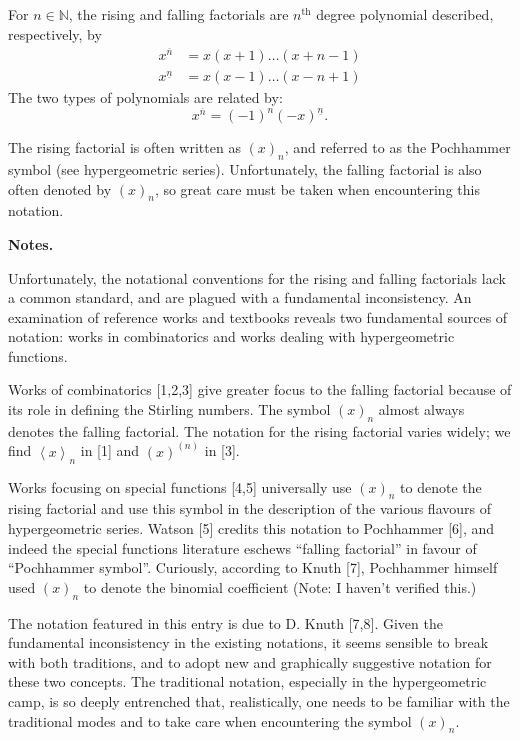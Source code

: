 \documentclass{article}
\newcommand{\natnums}{\mathbb{N}}
\newcommand{\supth}{^{\text{th}}}
\newcommand{\on}{{\overline{n}}}
\newcommand{\un}{{\underline{n}}}
\begin{document}
For $n\in\natnums$, the rising and falling factorials are $n\supth$
degree polynomial described, respectively, by
\begin{align*}
x^\on &= x(x+1)\ldots (x+n-1) \\
x^\un &= x(x-1)\ldots (x-n+1)
\end{align*}
The two types of polynomials are related by:
$$x^\on = (-1)^n (-x)^\un.$$


The rising factorial is often written as $(x)_n$, and referred to as
the Pochhammer symbol (see hypergeometric series). Unfortunately, the
falling factorial is also often denoted by $(x)_n$, so great care must
be taken when encountering this notation.


{\bf Notes.}  

Unfortunately, the notational conventions for the rising and falling
factorials lack a common standard, and are plagued with a fundamental
inconsistency. An examination of reference works and textbooks reveals
two fundamental sources of notation: works in combinatorics and works
dealing with hypergeometric functions.

Works of combinatorics [1,2,3] give greater focus to the falling
factorial because of its role in defining the Stirling numbers.
The symbol $(x)_n$ almost always denotes the falling factorial.  The
notation for the rising factorial varies widely; we find
$\left<x\right>_n$ in [1] and $(x)^{(n)}$ in [3].

Works focusing on special functions [4,5]  universally use $(x)_n$ to
denote the rising factorial and use this symbol in the description of
the various flavours of hypergeometric series.  Watson [5] credits
this notation to Pochhammer [6], and indeed the special functions
literature eschews ``falling factorial'' in favour of ``Pochhammer
symbol''.  Curiously, according to Knuth [7], Pochhammer himself used
$(x)_n$ to denote the binomial coefficient (Note: I haven't verified
this.)
 
The notation featured in this entry is due to D. Knuth [7,8].  Given
the fundamental inconsistency in the existing notations, it seems
sensible to break with both traditions, and to adopt new and
graphically suggestive notation for these two concepts.  The
traditional notation, especially in the hypergeometric camp, is so
deeply entrenched that, realistically, one needs to be familiar with
the traditional modes and to take care when encountering the symbol
$(x)_n$.
\end{document}
